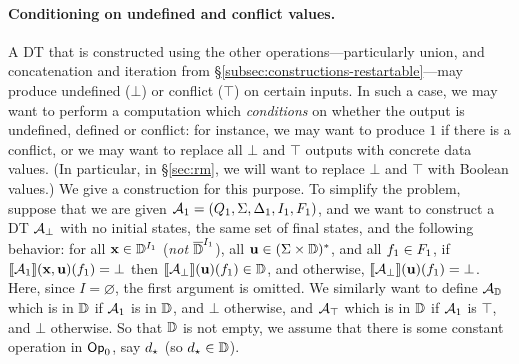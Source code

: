 \begin{figure*}[h]

\label{fig:prefix-sum}
\end{figure*}

\paragraph*{Conditioning on undefined and conflict values.}
A DT that is constructed using the other operations---particularly union, and concatenation and iteration from \S\ref{subsec:constructions-restartable}---may produce undefined ($\bot$) or conflict ($\top$) on certain inputs. In such a case, we may want to perform a computation which \emph{conditions} on whether the output is undefined, defined or conflict: for instance, we may want to produce $1$ if there is a conflict, or we may want to replace all $\bot$ and $\top$ outputs with concrete data values. (In particular, in \S\ref{sec:rm}, we will want to replace $\bot$ and $\top$ with Boolean values.) We give a construction for this purpose. To simplify the problem, suppose that we are given $\mathcal{A}_1 = (Q_{1}, \Sigma, \Delta_{1}, I_{1}, F_{1})$, and we want to construct a DT $\mathcal{A}_\bot$ with no initial states, the same set of final states, and the following behavior: for all $\textbf{x} \in \mathbb{D}^{I_1}$ (\emph{not} $\overline{\mathbb{D}{}}^{I_1}$), all $\textbf{u} \in (\Sigma \times \mathbb{D})^{*}$, and all $f_1 \in F_1$, if $\llbracket \mathcal{A}_1 \rrbracket(\textbf{x},\textbf{u})(f_1) = \bot$ then $\llbracket \mathcal{A}_\bot \rrbracket(\textbf{u})(f_1) \in \mathbb{D}$, and otherwise, $\llbracket \mathcal{A}_\bot \rrbracket(\textbf{u})(f_1) = \bot$. Here, since $I = \varnothing$, the first argument is omitted. We similarly want to define $\mathcal{A}_{\mathbb{D}}$ which is in $\mathbb{D}$ if $\mathcal{A}_1$ is in $\mathbb{D}$, and $\bot$ otherwise, and $\mathcal{A}_\top$ which is in $\mathbb{D}$ if $\mathcal{A}_1$ is $\top$, and $\bot$ otherwise.
So that $\mathbb{D}$ is not empty, we assume that there is some constant operation in $\textsf{Op}_0$, say $d_\star$ (so $d_\star \in \mathbb{D}$).

